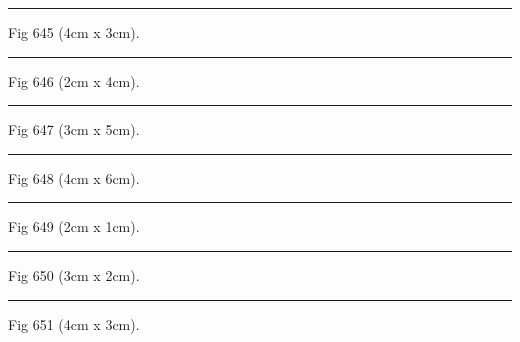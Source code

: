 \documentclass[a4paper,11pt]{article}
\begin{document}
\begin{swarmwrap}%
  \begin{minipage}[t]{4cm}
    \centering
    \rule{\linewidth}{3cm}
    {\footnotesize Fig 645 (4cm x 3cm).}
  \end{minipage}%
\end{swarmwrap}%
\swarmwrapnext
\lipsum[45]%

\begin{swarmwrap}%
  \begin{minipage}[t]{2cm}
    \centering
    \rule{\linewidth}{4cm}
    {\footnotesize Fig 646 (2cm x 4cm).}
  \end{minipage}%
\end{swarmwrap}%
\swarmwrapnext
\lipsum[46]%

\begin{swarmwrap}%
  \begin{minipage}[t]{3cm}
    \centering
    \rule{\linewidth}{5cm}
    {\footnotesize Fig 647 (3cm x 5cm).}
  \end{minipage}%
\end{swarmwrap}%
\swarmwrapnext
\lipsum[47]%

\begin{swarmwrap}%
  \begin{minipage}[t]{4cm}
    \centering
    \rule{\linewidth}{6cm}
    {\footnotesize Fig 648 (4cm x 6cm).}
  \end{minipage}%
\end{swarmwrap}%
\swarmwrapnext
\lipsum[48]%

\begin{swarmwrap}%
  \begin{minipage}[t]{2cm}
    \centering
    \rule{\linewidth}{1cm}
    {\footnotesize Fig 649 (2cm x 1cm).}
  \end{minipage}%
\end{swarmwrap}%
\swarmwrapnext
\lipsum[49]%

\begin{swarmwrap}%
  \begin{minipage}[t]{3cm}
    \centering
    \rule{\linewidth}{2cm}
    {\footnotesize Fig 650 (3cm x 2cm).}
  \end{minipage}%
\end{swarmwrap}%
\swarmwrapnext
\lipsum[50]%

\begin{swarmwrap}%
  \begin{minipage}[t]{4cm}
    \centering
    \rule{\linewidth}{3cm}
    {\footnotesize Fig 651 (4cm x 3cm).}
  \end{minipage}%
\end{swarmwrap}%
\swarmwrapnext
\lipsum[51]%
\end{document}
